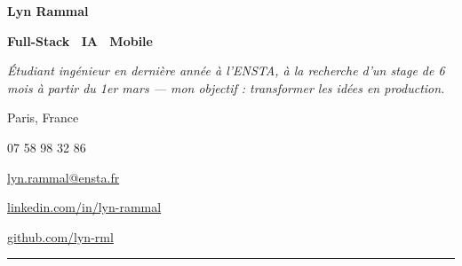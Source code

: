 \documentclass[10pt,a4paper]{article}
\makeatletter
\newcommand{\cvphone}{07 58 98 32 86}
\newcommand{\cvemail}{lyn.rammal@ensta.fr}
\newcommand{\cvlinkedin}{linkedin.com/in/lyn-rammal}
\newcommand{\cvgithub}{github.com/lyn-rml}
\newcommand{\cvlocation}{Paris, France}
\makeatother
\begin{document}
\begin{minipage}[t]{0.6\linewidth}
  {\fontsize{22}{24}\selectfont\bfseries\color{darkgray} Lyn Rammal}\par
  \vspace{2pt}
  {\small\bfseries\color{accent} Full-Stack \textperiodcentered\ IA \textperiodcentered\ Mobile}\par
  \vspace{6pt}
  {\normalsize\itshape\color{midgray}
  Étudiant ingénieur en dernière année à l'ENSTA, à la recherche d'un stage de 6 mois à partir du 1er mars --- mon objectif : transformer les idées en production.
  }\par
\end{minipage}%
\hfill
\begin{minipage}[t]{0.35\linewidth}
  \raggedleft
  {\small\color{darkgray} \cvlocation}\par
  \vspace{4pt}
  {\small\color{darkgray} \cvphone}\par
  \vspace{4pt}
  {\small\color{darkgray} \href{mailto:\cvemail}{\cvemail}}\par
  \vspace{4pt}
  {\small\color{darkgray} \href{https://\cvlinkedin}{\cvlinkedin}}\par
  \vspace{4pt}
  {\small\color{darkgray} \href{https://\cvgithub}{\cvgithub}}\par
\end{minipage}

\vspace{10pt}
{\color{accent}\rule{\linewidth}{0.8pt}}\par
\vspace{10pt}

\setlength{\columnsep}{22pt}
\setlength{\columnseprule}{0pt}
\end{document}
